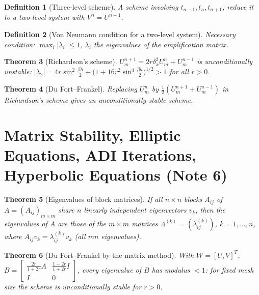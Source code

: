 \documentclass[10pt,a4paper]{article}
\theoremstyle{tight}
\newtheorem{theorem}{Theorem}[section]
\newtheorem{definition}[theorem]{Definition}
\begin{document}
\begin{definition}[Three-level scheme]
A scheme involving \(t_{n-1},t_n,t_{n+1}\); reduce it to a two-level system with \(V^n=U^{n-1}\).
\end{definition}

\begin{definition}[Von Neumann condition for a two-level system]
Necessary condition: \(\max_i|\lambda_i|\le1\), \(\lambda_i\) the eigenvalues of the amplification matrix.
\end{definition}

\begin{theorem}[Richardson's scheme]
\(U_m^{n+1}=2r\delta_x^2U_m^n+U_m^{n-1}\) is unconditionally unstable:
\(|\lambda_2|=4r\sin^2\frac{\beta h}2+\bigl(1+16r^2\sin^4\frac{\beta h}2\bigr)^{1/2}>1\) for all \(r>0\).
\end{theorem}

\begin{theorem}[Du Fort--Frankel]
Replacing \(U_m^n\) by \(\frac12(U_m^{n+1}+U_m^{n-1})\) in Richardson's scheme gives an
unconditionally stable scheme.
\end{theorem}

\section{Matrix Stability, Elliptic Equations, ADI Iterations, Hyperbolic Equations (Note 6)}

\begin{theorem}[Eigenvalues of block matrices]
If all \(n\times n\) blocks \(A_{ij}\) of \(A=(A_{ij})_{m\times m}\) share \(n\) linearly independent
eigenvectors \(v_k\), then the eigenvalues of \(A\) are those of the \(m\times m\) matrices
\(\Lambda^{(k)}=(\lambda_{ij}^{(k)})\), \(k=1,\dots,n\), where \(A_{ij}v_k=\lambda_{ij}^{(k)}v_k\)
(all \(mn\) eigenvalues).
\end{theorem}

\begin{theorem}[Du Fort--Frankel by the matrix method]
With \(W=[U,V]^T\), \(B=\begin{bmatrix}\frac{2r}{1+2r}A&\frac{1-2r}{1+2r}I\\I&0\end{bmatrix}\), every
eigenvalue of \(B\) has modulus \(<1\): for fixed mesh size the scheme is unconditionally stable for \(r>0\).
\end{theorem}
\end{document}
